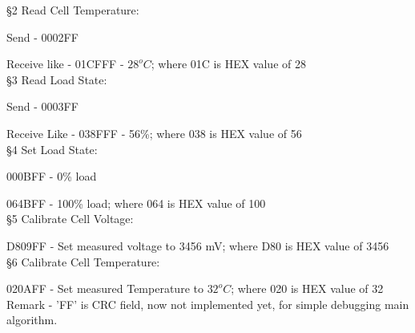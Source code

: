\documentclass{article}
\begin{document}
\S 2 Read Cell Temperature:

Send - 0002FF

Receive like - 01CFFF - $28 ^{o}C$; where 01C is HEX value of 28\\

\S 3 Read Load State:

Send - 0003FF

Receive Like - 038FFF - 56\%; where 038 is HEX value of 56\\

\S 4 Set Load State:

000BFF - 0\% load

064BFF - 100\% load; where 064 is HEX value of 100\\

\S 5 Calibrate Cell Voltage:

D809FF - Set measured voltage to 3456 mV; where D80 is HEX value of 3456\\

\S 6 Calibrate Cell Temperature:

020AFF - Set measured Temperature to $32 ^{o}C$; where 020 is HEX value of 32\\


Remark - 'FF' is CRC field, now not implemented yet, for simple debugging main algorithm.

\tableofcontents
\end{document}
